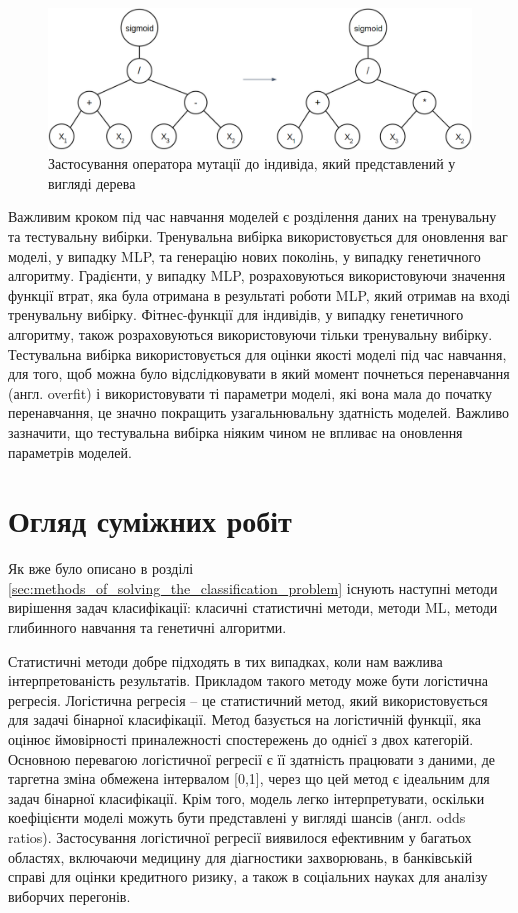 \begin{figure}[ht]
	\centering
	\includegraphics[scale=0.35]{Images/mut_example.png}
	\caption{Застосування оператора мутації до індивіда, який представлений у вигляді дерева}
	\label{fig_mut_ex}
\end{figure}

Важливим кроком під час навчання моделей є розділення даних на тренувальну та тестувальну вибірки. Тренувальна вибірка використовується для оновлення ваг моделі, у випадку MLP, та генерацію нових поколінь, у випадку генетичного алгоритму. Градієнти, у випадку MLP, розраховуються використовуючи значення функції втрат, яка була отримана в результаті роботи MLP, який отримав на вході тренувальну вибірку. Фітнес-функції для індивідів, у випадку генетичного алгоритму, також розраховуються використовуючи тільки тренувальну вибірку. Тестувальна вибірка використовується для оцінки якості моделі під час навчання, для того, щоб можна було відслідковувати в який момент почнеться перенавчання (англ. overfit) і використовувати ті параметри моделі, які вона мала до початку перенавчання, це значно покращить узагальнювальну здатність моделей. Важливо зазначити, що тестувальна вибірка ніяким чином не впливає на оновлення параметрів моделей.

\section{Огляд суміжних робіт}

Як вже було описано в розділі \ref{sec:methods_of_solving_the_classification_problem} існують наступні методи вирішення задач класифікації: класичні статистичні методи, методи ML, методи глибинного навчання та генетичні алгоритми.

Статистичні методи добре підходять в тих випадках, коли нам важлива інтерпретованість результатів. Прикладом такого методу може бути логістична регресія. Логістична регресія -- це статистичний метод, який використовується для задачі бінарної класифікації. Метод базується на логістичній функції, яка оцінює ймовірності приналежності спостережень до однієї з двох категорій. Основною перевагою логістичної регресії є її здатність працювати з даними, де таргетна зміна обмежена інтервалом [0,1], через що цей метод є ідеальним для задач бінарної класифікації. Крім того, модель легко інтерпретувати, оскільки коефіцієнти моделі можуть бути представлені у вигляді шансів (англ. odds ratios). Застосування логістичної регресії виявилося ефективним у багатьох областях, включаючи медицину для діагностики захворювань, в банківській справі для оцінки кредитного ризику, а також в соціальних науках для аналізу виборчих перегонів. 

